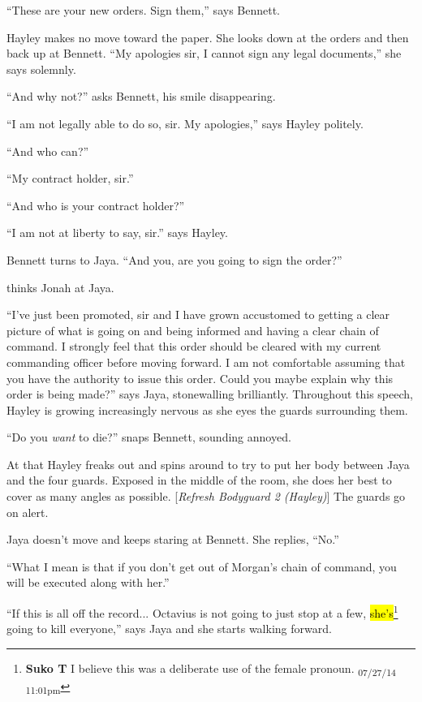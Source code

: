 ``These are your new orders.  Sign them,'' says Bennett.

Hayley makes no move toward the paper.  She looks down at the orders and then back up at Bennett.  ``My apologies sir, I cannot sign any legal documents,'' she says solemnly.

``And why not?'' asks Bennett, his smile disappearing.

``I am not legally able to do so, sir.  My apologies,'' says Hayley politely.

``And who can?''

``My contract holder, sir.''

``And who is your contract holder?''

``I am not at liberty to say, sir.'' says Hayley.

Bennett turns to Jaya.  ``And you, are you going to sign the order?''

 thinks Jonah at Jaya.

``I've just been promoted, sir and I have grown accustomed to getting a clear picture of what is going on and being informed and having a clear chain of command.  I strongly feel that this order should be cleared with my current commanding officer before moving forward.  I am not comfortable assuming that you have the authority to issue this order.  Could you maybe explain why this order is being made?'' says Jaya, stonewalling brilliantly.  Throughout this speech, Hayley is growing increasingly nervous as she eyes the guards surrounding them.

``Do you \textit{want} to die?'' snaps Bennett, sounding annoyed.

At that Hayley freaks out and spins around to try to put her body between Jaya and the four guards.  Exposed in the middle of the room, she does her best to cover as many angles as possible. {[}\textit{Refresh Bodyguard 2 (Hayley)}{]}  The guards go on alert.

Jaya doesn't move and keeps staring at Bennett.  She replies, ``No.''

``What I mean is that if you don't get out of Morgan's chain of command, you will be executed along with her.''

``If this is all off the record... Octavius is not going to just stop at a few, \hl{she's}\footnote{\textbf{Suko T }I believe this was a deliberate use of the female pronoun. \textsubscript{07/27/14 11:01pm}} going to kill everyone,'' says Jaya and she starts walking forward.

